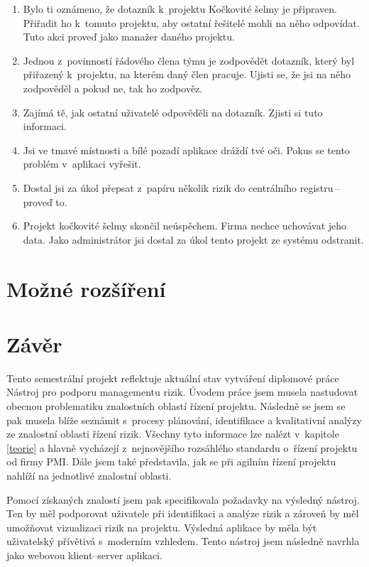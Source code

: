 \begin{enumerate}
    \item Bylo ti oznámeno, že dotazník k~projektu Kočkovité šelmy je připraven. Přiřadit ho k~tomuto projektu, aby ostatní řešitelé mohli na něho odpovídat. Tuto akci proveď jako manažer daného projektu.
    \item Jednou z~povinností řádového člena týmu je zodpovědět dotazník, který byl přiřazený k~projektu, na kterém daný člen pracuje. Ujisti se, že jsi na něho zodpověděl a pokud ne, tak ho zodpověz.
    \item Zajímá tě, jak ostatní uživatelé odpověděli na dotazník. Zjisti si tuto informaci.
    \item Jsi ve tmavé místnosti a bílé pozadí aplikace dráždí tvé oči. Pokus se tento problém v~aplikaci vyřešit.
    \item Dostal jsi za úkol přepsat z~papíru několik rizik do centrálního registru\,--\,proveď to.
    \item Projekt kočkovité šelmy skončil neúspěchem. Firma nechce uchovávat jeho data. Jako administrátor jsi dostal za úkol tento projekt ze systému odstranit.
\end{enumerate}


\chapter{Možné rozšíření}
\label{rozsireni}

\chapter{Závěr}
\label{zaver}

Tento semestrální projekt reflektuje aktuální stav vytváření diplomové práce Nástroj pro podporu managementu rizik. Úvodem práce jsem musela nastudovat obecnou problematiku znalostních oblastí řízení projektu. Následně se jsem se pak musela blíže seznámit s~procesy plánování, identifikace a kvalitativní analýzy ze znalostní oblasti řízení rizik. Všechny tyto informace lze nalézt v~kapitole \ref{teorie} a hlavně vycházejí z~nejnovějšího rozsáhlého standardu o~řízení projektu od firmy PMI.  Dále jsem také představila, jak se při agilním řízení projektu nahlíží na jednotlivé znalostní oblasti.

Pomocí získaných znalostí jsem pak specifikovala požadavky na výsledný nástroj. Ten by měl podporovat uživatele při identifikaci a analýze rizik a zároveň by měl umožňovat vizualizaci rizik na projektu. Výsledná aplikace by měla být uživatelský přívětivá s~moderním vzhledem. Tento nástroj jsem následně navrhla jako webovou klient--server aplikaci. 

